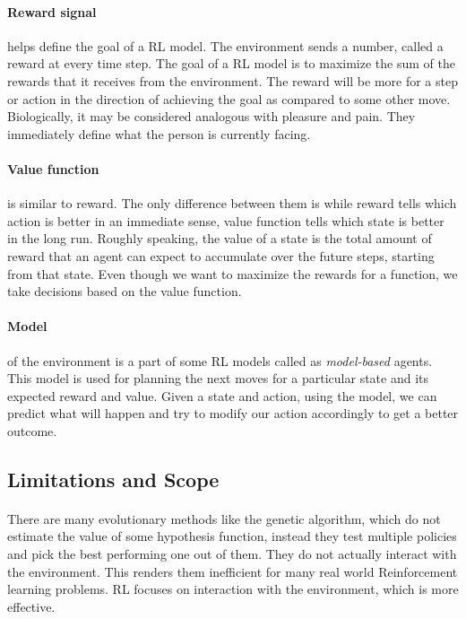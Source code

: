 \documentclass{article}
\begin{document}
    \paragraph{Reward signal} helps define the goal of a RL model. The environment sends a number, called a reward at every time step. The goal of a RL model is to maximize the sum of the rewards that it receives from the environment. The reward will be more for a step or action in the direction of achieving the goal as compared to some other move. Biologically, it may be considered analogous with pleasure and pain. They immediately define what the person is currently facing.
    \paragraph{Value function} is similar to reward. The only difference between them is while reward tells which action is better in an immediate sense, value function tells which state is better in the long run. Roughly speaking, the value of a state is the total amount of reward that an agent can expect to accumulate over the future steps, starting from that state. Even though we want to maximize the rewards for a function, we take decisions based on the value function.
    \paragraph{Model} of the environment is a part of some RL models called as \textit{model-based} agents. This model is used for planning the next moves for a particular state and its expected reward and value. Given a state and action, using the model, we can predict what will happen and try to modify our action accordingly to get a better outcome.

  \subsection{Limitations and Scope}
    \paragraph{} There are many evolutionary methods like the genetic algorithm, which do not estimate the value of some hypothesis function, instead they test multiple policies and pick the best performing one out of them. They do not actually interact with the environment. This renders them inefficient for many real world Reinforcement learning problems. RL focuses on interaction with the environment, which is more effective.
\end{document}
